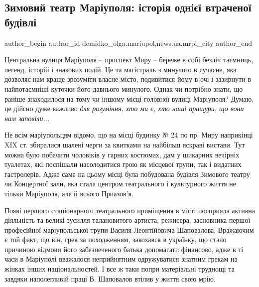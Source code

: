  
 
 
 
 
 
\subsection{Зимовий театр Маріуполя: історія однієї втраченої будівлі}
\label{sec:15_09_2017.stz.news.ua.mrpl_city.2.zymovyj_teatr_mariupolja}
 
\ifcmt
 author_begin
   author_id demidko_olga.mariupol,news.ua.mrpl_city
 author_end
\fi


Центральна вулиця Маріуполя – проспект Миру – береже в собі безліч таємниць,
легенд, історій і знакових подій. Це та магістраль з минулого в сучасне, яка
дозволяє нам краще зрозуміти власне місто, подивитися йому в очі і зазирнути в
найпотаємніші куточки його давнього минулого. Однак чи потрібно знати, що
раніше знаходилося на тому чи іншому місці головної вулиці Маріуполя? Думаю, це
дійсно дуже важливо \emph{для розуміння, хто ми є, хто наші пращури, що вони нам
заповіли...}


Не всім маріупольцям відомо, що на місці будинку № 24 по пр. Миру наприкінці
XIX ст. збиралися шалені черги за квитками на найбільш яскраві вистави. Тут
можна було побачити чоловіків у гарних костюмах, дам у шикарних вечірніх
туалетах, які поспішали насолодитися грою як місцевої трупи, так і видатних
гастролерів. Адже саме на цьому місці була побудована будівля Зимового театру
чи Концертної зали, яка стала центром театрального і культурного життя не
тільки Маріуполя, але й всього Приазов'я.


Появі першого стаціонарного театрального приміщення в місті посприяла активна
діяльність та великі зусилля талановитого артиста, режисера, засновника першої
професійної маріупольської трупи Василя Леонтійовича Шаповалова. Вражаючим є
той факт, що він, грек за походженням, закохався в українку, що стало причиною
відмови його забезпеченого батька допомагати фінансово, адже в ті часи в
Маріуполі вважалося неприйнятним одружуватися знатним грекам на жінках інших
національностей. І все ж таки попри матеріальні труднощі та завдяки
наполегливій праці В. Шаповалов втілив у життя свою мрію. 


